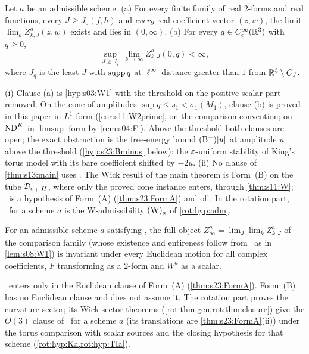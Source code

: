 
\begin{hypothesis}\label{hyp:s03:W2}
Let $a$ be an admissible scheme. (a) For every finite family of real $2$-forms and real functions, every $J\ge J_0(f,h)$ and \emph{every} real coefficient vector $(z,w)$, the limit $\lim_kZ^a_{k,J}(z,w)$ exists and lies in $(0,\infty)$. (b) For every $q\in C^\infty_c(\mathbb R^3)$ with $q\ge0$,
\[
\sup_{J\ge J_q}\ \lim_{k\to\infty}Z^{a}_{k,J}(0,q)<\infty ,
\]
where $J_q$ is the least $J$ with $\operatorname{supp} q$ at $\ell^\infty$-distance greater than $1$ from $\mathbb R^3\setminus C_J$.
\end{hypothesis}

\begin{remark}[on \Wtwo]\label{rem:s03:W2}
(i) Clause (a) is \cref{hyp:s03:W1} with the threshold on the positive scalar part removed. On the cone of amplitudes $\sup q\le s_1<\sigma_1(M_1)$, clause (b) is proved in this paper in $L^1$ form (\cref{cor:s11:W2prime}, on the comparison convention; on $\mathrm{ND}^{K}$ in $\limsup$ form by \cref{rem:s04:F}). Above the threshold both clauses are open; the exact obstruction is the free-energy bound $(\mathrm{B}^{-})[u]$ at amplitude $u$ above the threshold (\cref{hyp:s23:Bminus} below): the $\varepsilon$-uniform stability of King's torus model with its bare coefficient shifted by $-2u$.
(ii) No clause of \cref{thm:s13:main} uses \Wtwo. The Wick result of the main theorem is Form~(B) on the tube $\mathcal D_{\sigma_+,H}$, where only the proved cone instance enters, through \cref{thm:s11:W}; \Wtwo\ is a hypothesis of Form~(A) (\cref{thm:s23:FormA}) and of \RW. In the rotation part, \Wtwo\ for a scheme $a$ is the $\mathrm W$-admissibility $(\mathrm W)_{a}$ of \cref{rot:hyp:adm}.
\end{remark}

\begin{hypothesis}\label{hyp:s03:RW}
For an admissible scheme $a$ satisfying \Wtwo, the full object $Z^a_\infty=\lim_J\lim_kZ^a_{k,J}$ of the comparison family (whose existence and entireness follow from \Wtwo\ as in \cref{lem:s08:W1}) is invariant under every Euclidean motion for all complex coefficients, $F$ transforming as a $2$-form and $W^a$ as a scalar.
\end{hypothesis}

\begin{remark}[on \RW]\label{rem:s03:RW}
\RW\ enters only in the Euclidean clause of Form~(A) (\cref{thm:s23:FormA}). Form~(B) has no Euclidean clause and does not assume it. The rotation part proves the curvature sector; its Wick-sector theorems (\cref{rot:thm:gen,rot:thm:closure}) give the $O(3)$ clause of \RW\ for a scheme $a$ (its translations are \cref{thm:s23:FormA}(ii)) under the torus comparison with scalar sources and the closing hypothesis for that scheme (\cref{rot:hyp:Ka,rot:hyp:TIa}).
\end{remark}

